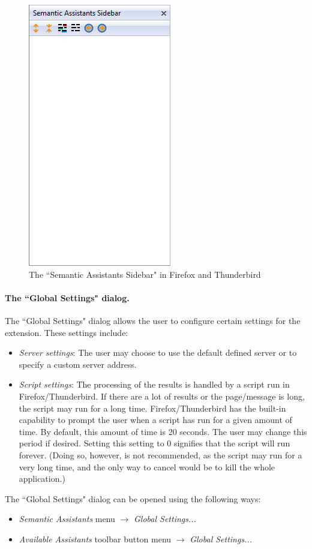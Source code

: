 \begin{figure}[htb]
  \centering
  \includegraphics[totalheight=0.5\textheight]{pictures/mozilla_features_sidebar.png}
  \caption{The ``Semantic Assistants Sidebar" in Firefox and Thunderbird}
  \label{fig:mozilla_features_sidebar}
\end{figure}

\paragraph{The ``Global Settings" dialog.} The ``Global Settings" dialog allows the user to configure certain settings for the extension. These settings include:
\begin{itemize} 
  \item \emph{Server settings}: The user may choose to use the default defined server or to specify a custom server address. 
  \item \emph{Script settings}: The processing of the results is handled by a script run in Firefox/Thunderbird. If there are a lot of results or the page/message is long, the script may run for a long time. Firefox/Thunderbird has the built-in capability to prompt the user when a script has run for a given amount of time. By default, this amount of time is 20 seconds. The user may change this period if desired. Setting this setting to 0 signifies that the script will run forever. (Doing so, however, is not recommended, as the script may run for a very long time, and the only way to cancel would be to kill the whole application.)
\end{itemize} 
The ``Global Settings" dialog can be opened using the following ways: 
\begin{itemize} 
  \item \emph{Semantic Assistants} menu $\rightarrow$ \emph{Global Settings...}
  \item \emph{Available Assistants} toolbar button menu $\rightarrow$ \emph{Global Settings...}
\end{itemize} 

